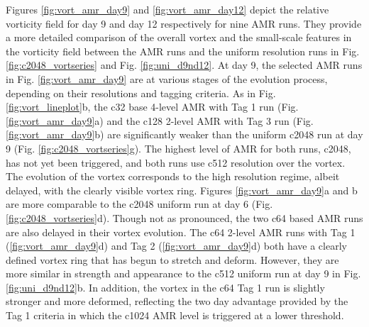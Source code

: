 \documentclass{ametsoc}
\begin{document}
Figures \ref{fig:vort_amr_day9} and \ref{fig:vort_amr_day12} depict the relative 
vorticity field for day 9 and day 12 respectively for nine AMR runs. They provide 
a more detailed comparison of the overall vortex and the small-scale features in the 
vorticity field between the AMR runs and the uniform resolution runs in 
Fig. \ref{fig:c2048_vortseries} and Fig. \ref{fig:uni_d9nd12}. At day 9, the selected
AMR runs in Fig. \ref{fig:vort_amr_day9} are at various stages of the 
evolution process, depending on their resolutions and tagging criteria. As in 
Fig. \ref{fig:vort_lineplot}b, the c32 base 4-level AMR with Tag 1 run (Fig. 
\ref{fig:vort_amr_day9}a) and the c128 2-level AMR with Tag 3 run (Fig.
\ref{fig:vort_amr_day9}b) are significantly weaker than the uniform c2048 run
at day 9 (Fig. \ref{fig:c2048_vortseries}g). The highest level of AMR for both runs, c2048,
has not yet been triggered, and both runs use c512 resolution over the vortex.
 The evolution of the vortex corresponds to the high resolution regime, albeit delayed, with the clearly visible
 vortex ring. Figures \ref{fig:vort_amr_day9}a and b are more comparable to
the c2048 uniform run at day 6 (Fig. \ref{fig:c2048_vortseries}d). Though not as pronounced,
the two c64 based AMR runs are also delayed in their vortex evolution. The c64 2-level AMR runs
with Tag 1 (\ref{fig:vort_amr_day9}d) and Tag 2  (\ref{fig:vort_amr_day9}d) both have a clearly
defined vortex ring that has begun to stretch and deform. However, they are more similar 
in strength and appearance to the c512 uniform run at day 9 in Fig. \ref{fig:uni_d9nd12}b. 
In addition, the vortex in the c64 Tag 1 run is slightly stronger and more deformed, reflecting the
two day advantage provided by the Tag 1 criteria in which the c1024 AMR level is triggered at a lower threshold.
\end{document}
